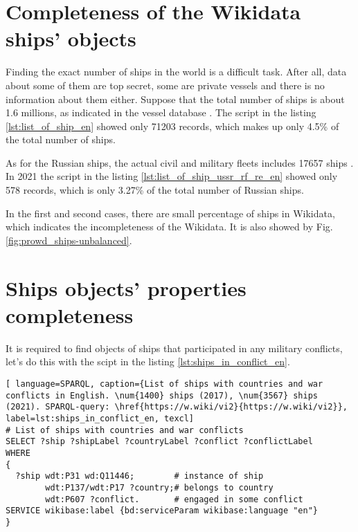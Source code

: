 \section{Completeness of the Wikidata ships' objects}

Finding the exact number of ships in the world is a difficult task. After all, data about some of them are top secret, some are private vessels and there is no information about them either. Suppose that the total number of ships is about 1.6 millions, as indicated in the vessel database . The script in the listing \ref{lst:list_of_ship_en} showed only \num{71203} records, which makes up only 4.5\% of the total number of ships. 

As for the Russian ships, the actual civil and military fleets includes \num{17657} ships . In 2021 the script in the listing \ref{lst:list_of_ship_ussr_rf_re_en} showed only 578 records, which is only 3.27\% of the total number of Russian ships. 

\label{question:ship_2}

In the first and second cases, there are small percentage of ships in Wikidata, which indicates the incompleteness of the Wikidata. It is also showed by Fig. \ref{fig:prowd_ships-unbalanced}.


\section{Ships objects' properties completeness}

It is required to find objects of ships that participated in any military conflicts, let's do this with the scipt in the listing \ref{lst:ships_in_conflict_en}.

\begin{lstlisting}[ language=SPARQL, caption={List of ships with countries and war conflicts in English. \num{1400} ships (2017), \num{3567} ships (2021). SPARQL-query: \href{https://w.wiki/vi2}{https://w.wiki/vi2}}, label=lst:ships_in_conflict_en, texcl]
# List of ships with countries and war conflicts
SELECT ?ship ?shipLabel ?countryLabel ?conflict ?conflictLabel
WHERE
{
  ?ship wdt:P31 wd:Q11446;        # instance of ship
        wdt:P137/wdt:P17 ?country;# belongs to country
        wdt:P607 ?conflict.       # engaged in some conflict
SERVICE wikibase:label {bd:serviceParam wikibase:language "en"}
}
\end{lstlisting}

